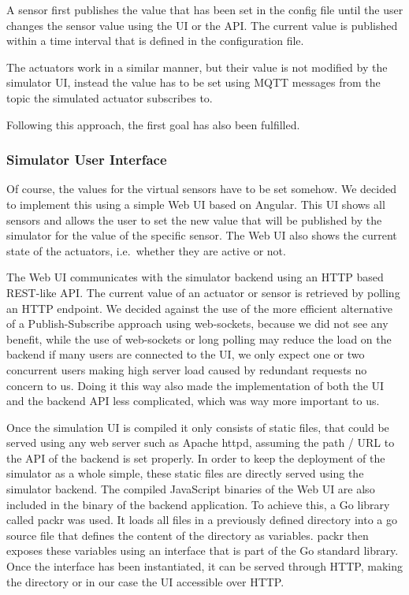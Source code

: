 A sensor first publishes the value that has been set in the config file
until the user changes the sensor value using the UI or the API. The
current value is published within a time interval that is defined in the
configuration file.

The actuators work in a similar manner, but their value is not modified
by the simulator UI, instead the value has to be set using MQTT messages
from the topic the simulated actuator subscribes to.

Following this approach, the first goal has also been fulfilled.

\subsubsection{Simulator User Interface}\label{ui}

Of course, the values for the virtual sensors have to be set somehow. We
decided to implement this using a simple Web UI based on Angular. This
UI shows all sensors and allows the user to set the new value that will
be published by the simulator for the value of the specific sensor. The
Web UI also shows the current state of the actuators, i.e.~whether they
are active or not.

The Web UI communicates with the simulator backend using an HTTP based
REST-like API. The current value of an actuator or sensor is retrieved
by polling an HTTP endpoint. We decided against the use of the more
efficient alternative of a Publish-Subscribe approach using web-sockets,
because we did not see any benefit, while the use of web-sockets or long
polling may reduce the load on the backend if many users are connected
to the UI, we only expect one or two concurrent users making high server
load caused by redundant requests no concern to us. Doing it this way
also made the implementation of both the UI and the backend API less
complicated, which was way more important to us.

Once the simulation UI is compiled it only consists of static files,
that could be served using any web server such as Apache httpd, assuming
the path / URL to the API of the backend is set properly. In order to
keep the deployment of the simulator as a whole simple, these static
files are directly served using the simulator backend. The compiled
JavaScript binaries of the Web UI are also included in the binary of the
backend application. To achieve this, a Go library called packr was
used. It loads all files in a previously defined directory into a go
source file that defines the content of the directory as variables.
packr then exposes these variables using an interface that is part of
the Go standard library. Once the interface has been instantiated, it
can be served through HTTP, making the directory or in our case the UI
accessible over HTTP.

